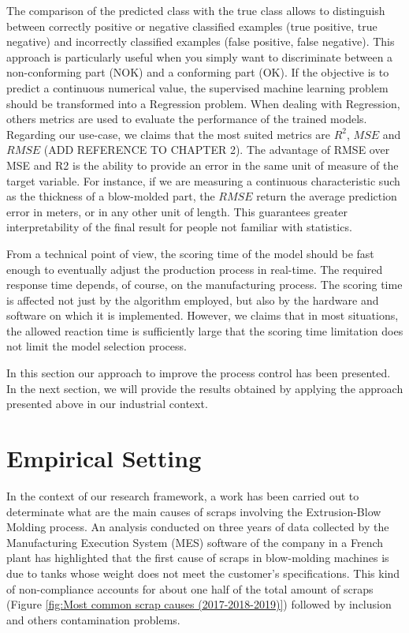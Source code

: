 The comparison of the predicted class with the true class allows to distinguish between correctly positive or negative classified examples (true positive, true negative) and incorrectly classified examples (false positive, false negative). This approach is particularly useful when you simply want to discriminate between a non-conforming part (NOK) and a conforming part (OK). If the objective is to predict a continuous numerical value, the supervised machine learning problem should be transformed into a Regression problem. When dealing with Regression, others metrics are used to evaluate the performance of the trained models. Regarding our use-case, we claims that the most suited metrics are $R^2$, $MSE$ and $RMSE$ (ADD REFERENCE TO CHAPTER 2). The advantage of RMSE over MSE and R2 is the ability to provide an error in the same unit of measure of the target variable. For instance, if we are measuring a continuous characteristic such as the thickness of a blow-molded part, the $RMSE$ return the average prediction error in meters, or in any other unit of length. This guarantees greater interpretability of the final result for people not familiar with statistics.

From a technical point of view, the scoring time of the model should be fast enough to eventually adjust the production process in real-time. The required response time depends, of course, on the manufacturing process. The scoring time is affected not just by the algorithm employed, but also by the hardware and software on which it is implemented. However, we claims that in most situations, the allowed reaction time is sufficiently large that the scoring time limitation does not limit the model selection process.


In this section our approach to improve the process control has been presented. In the next section, we will provide the results obtained by applying the approach presented above in our industrial context.

\section{Empirical Setting} \label{Empirical Setting}

In the context of our research framework, a work has been carried out to determinate what are the main causes of scraps involving the Extrusion-Blow Molding process. An analysis conducted on three years of data collected by the Manufacturing Execution System (MES) software of the company in a French plant has highlighted that the first cause of scraps in blow-molding machines is due to tanks whose weight does not meet the customer's specifications. This kind of non-compliance accounts for about one half of the total amount of scraps (Figure \ref{fig:Most common scrap causes (2017-2018-2019)}) followed by inclusion and others contamination problems. 

